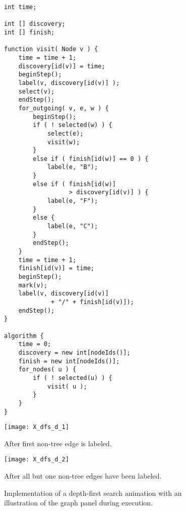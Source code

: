 
\begin{figure}

\begin{minipage}{0.5\textwidth}
\small

\begin{verbatim}
int time;

int [] discovery;
int [] finish;

function visit( Node v ) {
    time = time + 1;
    discovery[id(v)] = time;
    beginStep();
    label(v, discovery[id(v)] );
    select(v);
    endStep();
    for_outgoing( v, e, w ) {
        beginStep();
        if ( ! selected(w) ) {
            select(e);
            visit(w);
        }
        else if ( finish[id(w)] == 0 ) {
            label(e, "B");
        }
        else if ( finish[id(w)] 
                  > discovery[id(v)] ) {
            label(e, "F");
        }
        else {
            label(e, "C");
        }
        endStep();
    }
    time = time + 1;
    finish[id(v)] = time;
    beginStep();
    mark(v);
    label(v, discovery[id(v)]
             + "/" + finish[id(v)]);
    endStep();
}

algorithm {
    time = 0;
    discovery = new int[nodeIds()];
    finish = new int[nodeIds()];
    for_nodes( u ) {
        if ( ! selected(u) ) {
            visit( u );
        }
    }
}
\end{verbatim}
\end{minipage}
\begin{minipage}{0.49\textwidth}
\centering

\texttt{[image: X\_dfs\_d\_1]}

After first non-tree edge is labeled. 

\medskip

\texttt{[image: X\_dfs\_d\_2]}

After all but one non-tree edges have been labeled.

\end{minipage}
\caption{Implementation of a depth-first search animation
  with an illustration of the graph panel during execution.}
\label{fig:dfs}
\end{figure}
